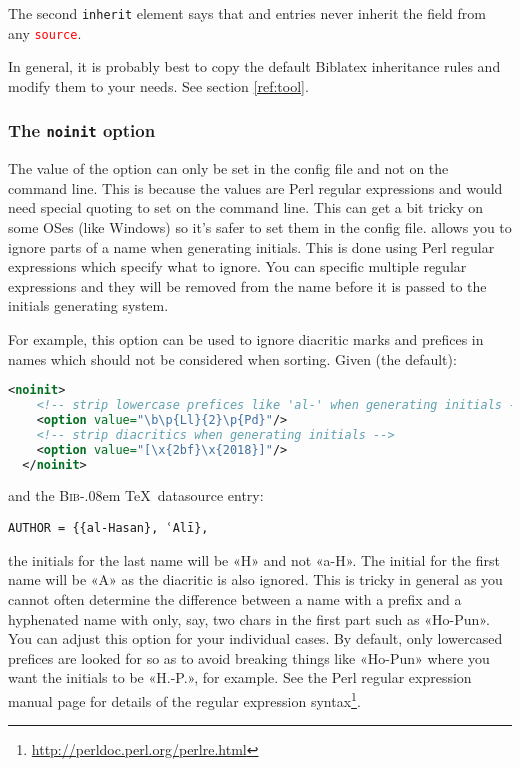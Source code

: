 \documentclass{ltxdockit}
\def\BibTeX{\textsc{Bib}\kern-.08em \TeX}
\newcommand*{\biblatex}{Biblatex\xspace}
\begin{document}
The second \texttt{inherit} element says that  and
 entries never inherit the 
field from any \textcolor{red}{\texttt{source}}.

In general, it is probably best to copy the default \biblatex inheritance
rules and modify them to your needs. See section \ref{ref:tool}.
\bigskip
\subsubsection{The \texttt{noinit} option}\label{noinit}

The value of the  option can only be set in the config file and
not on the command line. This is because the values are Perl regular
expressions and would need special quoting to set on the command line. This
can get a bit tricky on some OSes (like Windows) so it's safer to set them
in the config file.  allows you to ignore parts of a name when
generating initials. This is done using Perl regular expressions which
specify what to ignore. You can specific multiple regular expressions and
they will be removed from the name before it is passed to the initials
generating system.

For example, this option can be used to ignore diacritic marks and prefices
in names which should not be considered when sorting. Given (the default):

\begin{lstlisting}[language=xml]
  <noinit>
    <!-- strip lowercase prefices like 'al-' when generating initials -->
    <option value="\b\p{Ll}{2}\p{Pd}"/>
    <!-- strip diacritics when generating initials -->
    <option value="[\x{2bf}\x{2018}]"/>
  </noinit>
\end{lstlisting}

\noindent and the \BibTeX\ datasource entry:

\begin{verbatim}
AUTHOR = {{al-Hasan}, ʿAlī},
\end{verbatim}

\noindent the initials for the last name will be «H» and not «a-H». The
initial for the first name will be «A» as the diacritic is also ignored.
This is tricky in general as you cannot often determine the difference
between a name with a prefix and a hyphenated name with only, say, two
chars in the first part such as «Ho-Pun». You can adjust this option for
your individual cases. By default, only lowercased prefices are looked for
so as to avoid breaking things like «Ho-Pun» where you want the initials to
be «H.-P.», for example. See the Perl regular expression manual page for
details of the regular expression
syntax\footnote{\url{http://perldoc.perl.org/perlre.html}}.
\end{document}
